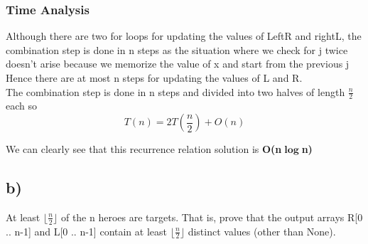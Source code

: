 \documentclass{report}
\begin{document}
 \subsubsection*{Time Analysis}
 Although there are two for loops for updating the values of LeftR and rightL, the combination step is done in n steps as the situation where we check for j twice doesn't arise because we memorize the value of x and start from the previous j Hence there are at most n steps for updating the values of L and R.\\
 The combination step is done in n steps and divided into two halves of length $\frac{n}{2}$ each so
 \begin{equation*}
     T(n) = 2T(\frac{n}{2}) + O(n)
 \end{equation*}
 \begin{center} 
\end{center}
We can clearly see that this recurrence relation solution is \textbf{O(n$\mathbf{\log}$n)}
 \subsection*{b)}
 At least $\lfloor\frac{n}{2}\rfloor$ of the n heroes are targets. That is, prove that the output arrays R[0 .. n-1] and L[0 .. n-1] contain at least $\lfloor\frac{n}{2}\rfloor$ distinct values (other than None).
 
\end{document}
